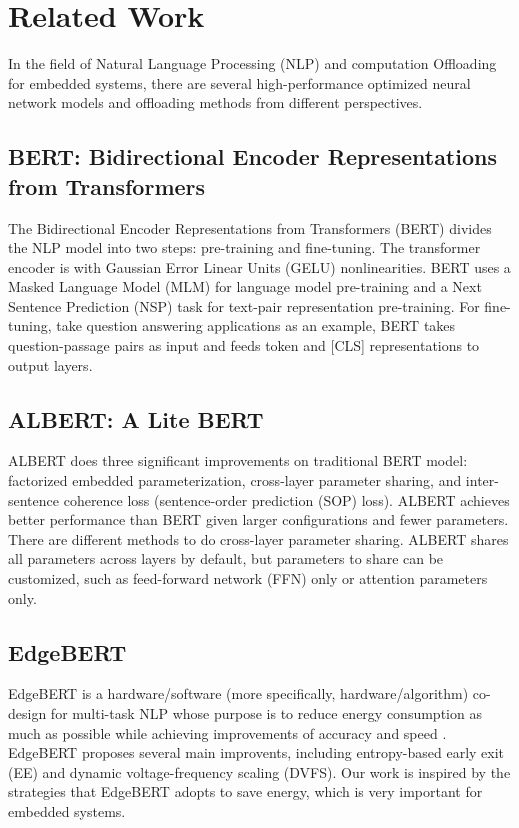 \documentclass[a4paper]{article}
\begin{document}
\section{Related Work}
In the field of Natural Language Processing (NLP) and computation Offloading for embedded systems, there are several high-performance optimized neural network models and offloading methods from different perspectives.
\subsection{BERT: Bidirectional Encoder Representations from Transformers}
The Bidirectional Encoder Representations from Transformers (BERT) \cite{devlin2019bert} divides the NLP model into two steps: pre-training and fine-tuning. The transformer encoder is with Gaussian Error Linear Units (GELU) nonlinearities. BERT uses a Masked Language Model (MLM) for language model pre-training and a Next Sentence Prediction (NSP) task for text-pair representation pre-training. For fine-tuning, take question answering applications as an example, BERT takes question-passage pairs as input and feeds token and \textsf{[CLS]} representations to output layers.
\subsection{ALBERT: A Lite BERT}
ALBERT \cite{lan2020albert} does three significant improvements on traditional BERT model: factorized embedded parameterization, cross-layer parameter sharing, and inter-sentence coherence loss (sentence-order prediction (SOP) loss). ALBERT achieves better performance than BERT given larger configurations and fewer parameters. There are different methods to do cross-layer parameter sharing. ALBERT shares all parameters across layers by default, but parameters to share can be customized, such as feed-forward network (FFN) only or attention parameters only.
\subsection{EdgeBERT}
EdgeBERT is a hardware/software (more specifically, hardware/algorithm) co-design for multi-task NLP whose purpose is to reduce energy consumption as much as possible while achieving improvements of accuracy and speed \cite{tambe2021edgebert}. EdgeBERT proposes several main improvents, including entropy-based early exit (EE) and dynamic voltage-frequency scaling (DVFS). Our work is inspired by the strategies that EdgeBERT adopts to save energy, which is very important for embedded systems.
\end{document}
